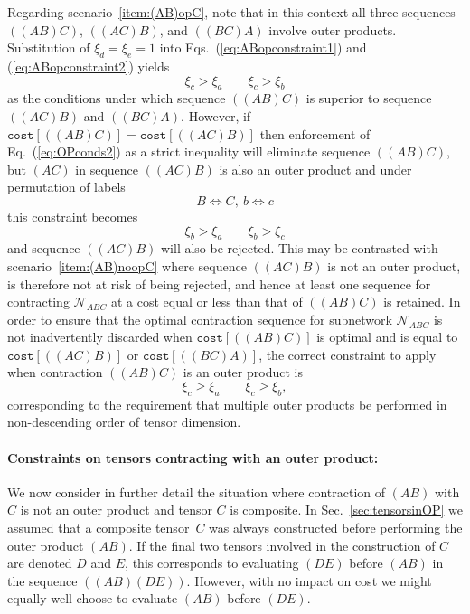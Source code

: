 \documentclass[aps,pre,reprint,superscriptaddress,amsfonts,amsmath,showpacs,nofootinbib,floatfix]{revtex4-1}
\newcommand{\mc}[1]{\mathcal{#1}}
\newcommand{\Eref}[1]{Eq.~(\ref{#1})}
\newcommand{\Erefs}[2]{Eqs.~(\ref{#1}) and (\ref{#2})}
\newcommand{\sref}[1]{Sec.~\ref{#1}}
\newcommand{\scref}[1]{scenario~\ref{#1}}
\newcommand{\ttt}[1]{\texttt{#1}}
\newcommand{\xa}{\xi_a}
\newcommand{\xb}{\xi_b}
\newcommand{\xc}{\xi_c}
\newcommand{\xd}{\xi_d}
\newcommand{\xe}{\xi_e}
\begin{document}
Regarding \scref{item:(AB)opC}, note that in this context all three sequences $((AB)C)$, $((AC)B)$, and $((BC)A)$ involve outer products. Substitution of $\xd=\xe=1$ into \Erefs{eq:ABopconstraint1}{eq:ABopconstraint2} yields
\begin{equation}
\xc>\xa\qquad\xc>\xb\label{eq:OPconds2}
\end{equation}
as the conditions under which sequence $((AB)C)$ is superior to sequence $((AC)B)$ and $((BC)A)$. However, if $\ttt{cost}[((AB)C)]=\ttt{cost}[((AC)B)]$ then enforcement of \Eref{eq:OPconds2} as a strict inequality will eliminate sequence $((AB)C)$, but $(AC)$ in sequence $((AC)B)$ is also an outer product and under permutation of labels
\begin{equation}
B\Leftrightarrow C,~b\Leftrightarrow c
\end{equation}
this constraint becomes
\begin{equation}
\xb>\xa\qquad\xb>\xc\label{eq:OPconds2a}
\end{equation}
and sequence $((AC)B)$ will also be rejected. This may be contrasted with \scref{item:(AB)noopC} where sequence $((AC)B)$ is not an outer product, is therefore not at risk of being rejected, and hence at least one sequence for contracting $\mc{N}_{ABC}$ at a cost equal or less than that of $((AB)C)$ is retained. In order to ensure that the optimal contraction sequence for subnetwork $\mc{N}_{ABC}$ is not inadvertently discarded when $\ttt{cost}[((AB)C)]$ is optimal and is equal to $\ttt{cost}[((AC)B)]$ or $\ttt{cost}[((BC)A)]$, the correct constraint to apply when contraction $((AB)C)$ is an outer product is 
\begin{equation}
\xc\geq\xa\qquad\xc\geq\xb,\label{eq:OPconds2*}
\end{equation}
corresponding to the requirement that multiple outer products be performed in non-descending order of tensor dimension.



\paragraph{Constraints on tensors contracting with an outer product:\label{sec:tensorswithOP}}
We now consider in further detail the situation where contraction of $(AB)$ with $C$ is not an outer product and tensor $C$ is composite. In \sref{sec:tensorsinOP} we assumed that a composite tensor~$C$ was always constructed before performing the outer product $(AB)$. 
If the final two tensors involved in the construction of $C$ are denoted $D$ and $E$, this corresponds to evaluating $(DE)$ before $(AB)$ in the sequence $((AB)(DE))$. However, with no impact on cost we might equally well choose to evaluate $(AB)$ before $(DE)$.
\end{document}
